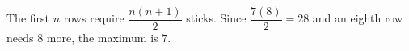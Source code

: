 The first $n$ rows require $\dfrac{n(n+1)}{2}$ sticks. Since $\dfrac{7(8)}{2}=28$ and an eighth row needs 8 more, the maximum is $\boxed7$.

